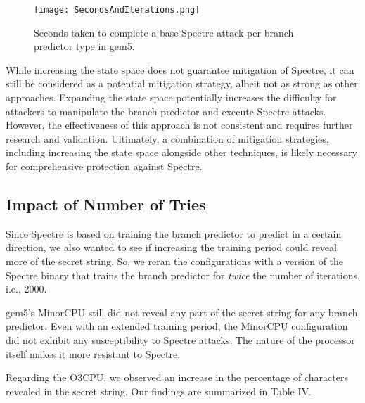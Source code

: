 \documentclass[twocolumn,showpacs,%
  nofootinbib,aps,superscriptaddress,%
  eqsecnum,prd,notitlepage,showkeys,10pt]{revtex4-1}
\begin{document}
\begin{figure}
    \centering
    \texttt{[image: SecondsAndIterations.png]}
    \caption{Seconds taken to complete a base Spectre attack per branch predictor type in gem5.}
\end{figure}

While increasing the state space does not guarantee mitigation of Spectre, it can still be considered as a potential mitigation strategy, albeit not as strong as other approaches. Expanding the state space potentially increases the difficulty for attackers to manipulate the branch predictor and execute Spectre attacks. However, the effectiveness of this approach is not consistent and requires further research and validation. Ultimately, a combination of mitigation strategies, including increasing the state space alongside other techniques, is likely necessary for comprehensive protection against Spectre.

\subsection{Impact of Number of Tries}

Since Spectre is based on training the branch predictor to predict in a certain direction, we also wanted to see if increasing the training period could reveal more of the secret string. So, we reran the configurations with a version of the Spectre binary that trains the branch predictor for \textit{twice} the number of iterations, i.e., 2000.

gem5's MinorCPU still did not reveal any part of the secret string for any branch predictor. Even with an extended training period, the MinorCPU configuration did not exhibit any susceptibility to Spectre attacks. The nature of the processor itself makes it more resistant to Spectre.

Regarding the O3CPU, we observed an increase in the percentage of characters revealed in the secret string. Our findings are summarized in Table IV.
\end{document}
